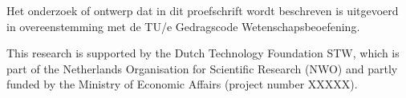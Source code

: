 \vspace{7cm}

\noindent Het onderzoek of ontwerp dat in dit proefschrift wordt beschreven is uitgevoerd
in overeenstemming met de TU/e Gedragscode Wetenschapsbeoefening.

\clearpage


\vspace*{4cm}
\noindent This research is supported by the Dutch Technology Foundation STW, which is part
of the Netherlands Organisation for Scientific Research (NWO) and partly funded
by the Ministry of Economic Affairs (project number XXXXX).

